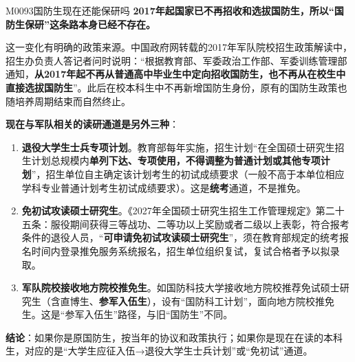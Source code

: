 \begin{qa}{M0093}{国防生现在还能保研吗}
\textbf{2017年起国家已不再招收和选拔国防生，所以“国防生保研”这条路本身已经不存在。}

这一变化有明确的政策来源。中国政府网转载的2017年军队院校招生政策解读中，招生办负责人答记者问时说明：“根据教育部、军委政治工作部、军委训练管理部通知，\textbf{从2017年起不再从普通高中毕业生中定向招收国防生，也不再从在校生中直接选拔国防生}”。此后在校本科生中不再新增国防生身份，原有的国防生政策也随培养周期结束而自然终止。

\textbf{现在与军队相关的读研通道是另外三种}：

\begin{enumerate}
  \item \textbf{退役大学生士兵专项计划}。教育部每年实施，招生计划“在全国硕士研究生招生计划总规模内\textbf{单列下达、专项使用，不得调整为普通计划或其他专项计划}”，招生单位自主确定该计划考生的初试成绩要求（一般不高于本单位相应学科专业普通计划考生初试成绩要求）。这是\textbf{统考}通道，不是推免。
  \item \textbf{免初试攻读硕士研究生}。《2027年全国硕士研究生招生工作管理规定》第二十五条：服役期间获得三等战功、二等功以上奖励或者二级以上表彰，符合报考条件的退役人员，“\textbf{可申请免初试攻读硕士研究生}”，须在教育部规定的统考报名时间内登录推免服务系统报名，招生单位组织复试，复试合格者予以拟录取。
  \item \textbf{军队院校接收地方院校推免生}。如国防科技大学接收地方院校推荐免试硕士研究生（含直博生、\textbf{参军入伍生}），设有“国防科工计划”，面向地方院校推免生。这是“参军入伍生”路径，与旧“国防生”不同。
\end{enumerate}

\textbf{结论}：如果你是原国防生，按当年的协议和政策执行；如果你是现在在读的本科生，对应的是“大学生应征入伍→退役大学生士兵计划”或“免初试”通道。
\end{qa}


